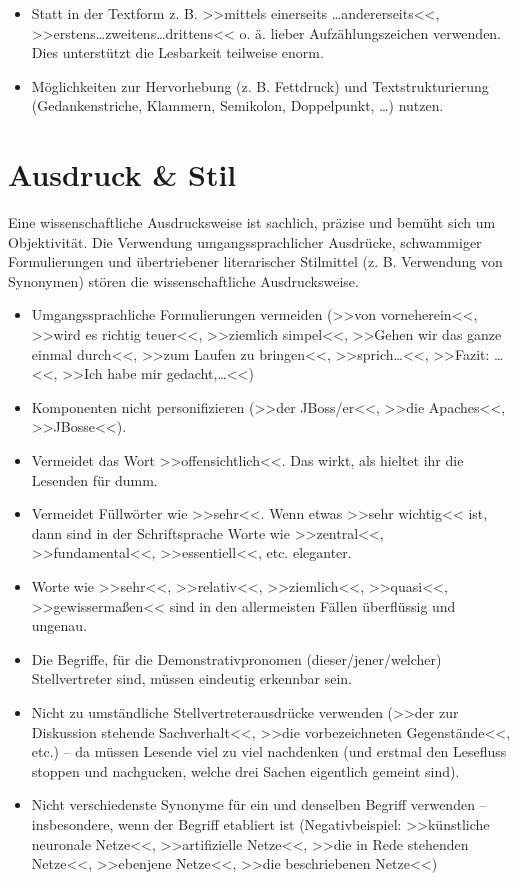 \begin{itemize}
\item Statt in der Textform z. B. >>mittels einerseits \ldots andererseits<<,\\>>erstens\ldots zweitens\ldots drittens<< o. ä. lieber Aufzählungszeichen verwenden. Dies unterstützt die Lesbarkeit teilweise enorm.
\item Möglichkeiten zur Hervorhebung (z. B. Fettdruck) und Textstrukturierung (Gedankenstriche, Klammern, Semikolon, Doppelpunkt, \ldots) nutzen.
\end{itemize}



\section{Ausdruck \& Stil}

Eine wissenschaftliche Ausdrucksweise ist sachlich, präzise und bemüht sich um Objektivität. Die Verwendung umgangssprachlicher Ausdrücke, schwammiger Formulierungen und übertriebener literarischer Stilmittel (z. B. Verwendung von Synonymen) stören die wissenschaftliche Ausdrucksweise.

\begin{itemize}
\item Umgangssprachliche Formulierungen vermeiden (>>von vorneherein<<, >>wird es richtig teuer<<, >>ziemlich simpel<<, >>Gehen wir das ganze einmal durch<<, >>zum Laufen zu bringen<<, >>sprich\ldots<<, >>Fazit: \ldots<<, >>Ich habe mir gedacht,\ldots<<)
\item Komponenten nicht personifizieren (>>der JBoss/er<<, >>die Apaches<<, >>JBosse<<).
\item    Vermeidet das Wort >>offensichtlich<<. Das wirkt, als hieltet ihr die Lesenden für dumm.
\item    Vermeidet Füllwörter wie >>sehr<<. Wenn etwas >>sehr wichtig<< ist, dann sind in der Schriftsprache Worte wie >>zentral<<, >>fundamental<<, >>essentiell<<, etc. eleganter.
\item    Worte wie >>sehr<<, >>relativ<<, >>ziemlich<<, >>quasi<<, >>gewissermaßen<< sind in den allermeisten Fällen überflüssig und ungenau.
\item    Die Begriffe, für die Demonstrativpronomen (dieser/jener/welcher) Stellvertreter sind, müssen eindeutig erkennbar sein.
\item    Nicht zu umständliche Stellvertreterausdrücke verwenden (>>der zur Diskussion stehende Sachverhalt<<, >>die vorbezeichneten Gegenstände<<, etc.) -- da müssen Lesende viel zu viel nachdenken (und erstmal den Lesefluss stoppen und nachgucken, welche drei Sachen eigentlich gemeint sind).
\item    Nicht verschiedenste Synonyme für ein und denselben Begriff verwenden -- insbesondere, wenn der Begriff etabliert ist (Negativbeispiel: >>künstliche neuronale Netze<<, >>artifizielle Netze<<, >>die in Rede stehenden Netze<<, >>ebenjene Netze<<, >>die beschriebenen Netze<<)
\end{itemize}



